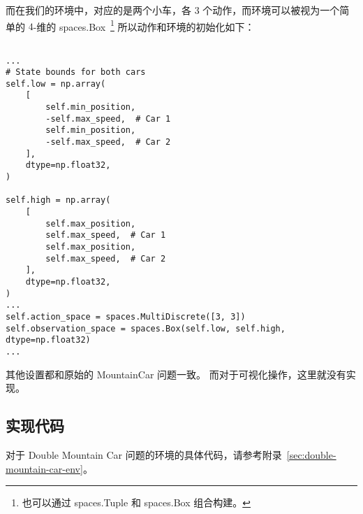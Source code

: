 而在我们的环境中，对应的是两个小车，各 \(3\) 个动作，而环境可以被视为一个简单的 \(4\)-维的 \textsf{spaces.Box}~\footnote{也可以通过 \textsf{spaces.Tuple} 和 \textsf{spaces.Box} 组合构建。} 所以动作和环境的初始化如下：
\begin{verbatim}

...
# State bounds for both cars
self.low = np.array(
    [
        self.min_position,
        -self.max_speed,  # Car 1
        self.min_position,
        -self.max_speed,  # Car 2
    ],
    dtype=np.float32,
)

self.high = np.array(
    [
        self.max_position,
        self.max_speed,  # Car 1
        self.max_position,
        self.max_speed,  # Car 2
    ],
    dtype=np.float32,
)
...
self.action_space = spaces.MultiDiscrete([3, 3])
self.observation_space = spaces.Box(self.low, self.high, dtype=np.float32)
...
\end{verbatim}
其他设置都和原始的 MountainCar 问题一致。
而对于可视化操作，这里就没有实现。

\subsection{实现代码}

对于 Double Mountain Car 问题的环境的具体代码，请参考附录~\ref{sec:double-mountain-car-env}。
